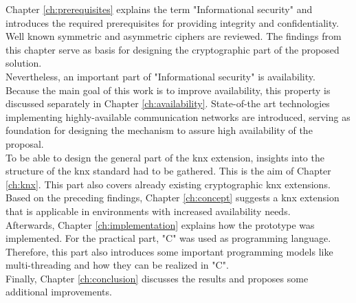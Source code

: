 Chapter \ref{ch:prerequisites} explains the term "Informational security" and introduces the required prerequisites for providing integrity and confidentiality.
Well known symmetric and asymmetric ciphers are reviewed. The findings from this chapter serve as basis for designing the cryptographic part of the proposed solution.  
\\
Nevertheless, an important part of "Informational security" is availability. Because the main goal of this work is to improve availability, this property 
is discussed separately in Chapter \ref{ch:availability}. State-of-the art technologies implementing highly-available communication networks are introduced, serving as
foundation for designing the mechanism to assure high availability of the proposal.
\\
To be able to design the general part of the \gls{knx} extension, insights into the structure of the \gls{knx} standard had to be gathered. This is the aim of Chapter \ref{ch:knx}.
This part also covers already existing cryptographic \gls{knx} extensions.
\\
Based on the preceding findings, Chapter \ref{ch:concept} suggests a \gls{knx} extension that is applicable in environments with increased availability needs. 
\\
Afterwards, Chapter \ref{ch:implementation} explains how the prototype was implemented. For the practical part, "C" was used as programming language. Therefore, this part
also introduces some important programming models like multi-threading and how they can be realized in "C".
\\
Finally, Chapter \ref{ch:conclusion} discusses the results and proposes some additional improvements.



